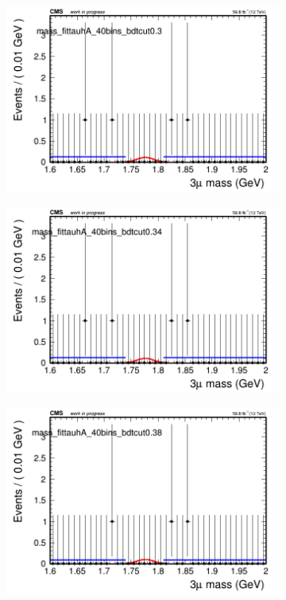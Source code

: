 \begin{figure}[H]
\begin{subfigure}{0.2\textwidth}
        \caption{}
    \end{subfigure}
    \begin{subfigure}{0.2\textwidth}
        \includegraphics[width=\textwidth]{flat_fit/plots/tauhA/massfit_tauhA_40bins_bdtcut0.3.png}
        \caption{}
    \end{subfigure}
    \begin{subfigure}{0.2\textwidth}
        \includegraphics[width=\textwidth]{flat_fit/plots/tauhA/massfit_tauhA_40bins_bdtcut0.34.png}
        \caption{}
    \end{subfigure}
    \begin{subfigure}{0.2\textwidth}
        \includegraphics[width=\textwidth]{flat_fit/plots/tauhA/massfit_tauhA_40bins_bdtcut0.38.png}

\end{subfigure}
\end{figure}
